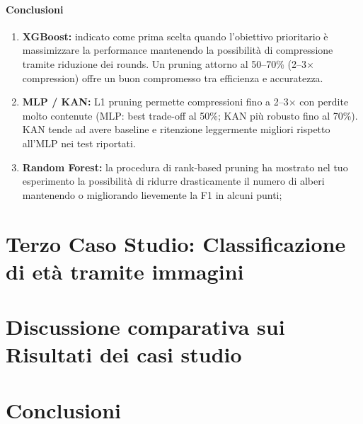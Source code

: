 \documentclass[a4paper,12pt]{report}
\begin{document}
	\subsubsection{Conclusioni}
	\begin{enumerate}
		\item \textbf{XGBoost:} indicato come prima scelta quando l'obiettivo prioritario è massimizzare la performance mantenendo la possibilità di compressione tramite riduzione dei rounds. Un pruning attorno al 50--70\% (2--3$\times$ compression) offre un buon compromesso tra efficienza e accuratezza.
		\item \textbf{MLP / KAN:} L1 pruning permette compressioni fino a 2--3$\times$ con perdite molto contenute (MLP: best trade-off al 50\%; KAN più robusto fino al 70\%). KAN tende ad avere baseline e ritenzione leggermente migliori rispetto all'MLP nei test riportati.
		\item \textbf{Random Forest:} la procedura di rank-based pruning ha mostrato nel tuo esperimento la possibilità di ridurre drasticamente il numero di alberi mantenendo o migliorando lievemente la F1 in alcuni punti;
	\end{enumerate}
	
	\chapter{Terzo Caso Studio: Classificazione di età tramite immagini}
	
	\chapter{Discussione comparativa sui Risultati dei casi studio}
	
	\chapter{Conclusioni}
	
\end{document}
